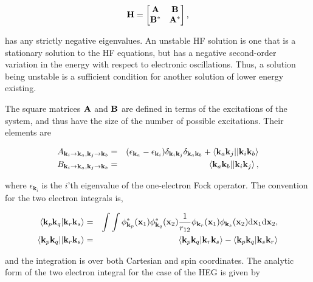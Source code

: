 \documentclass{revtex4}
\newcommand{\ki}{\mathbf{k}_{i}}
\newcommand{\kj}{\mathbf{k}_{j}}
\newcommand{\ka}{\mathbf{k}_{a}}
\newcommand{\kb}{\mathbf{k}_{b}}
\newcommand{\kp}{\mathbf{k}_{p}}
\newcommand{\kq}{\mathbf{k}_{q}}
\newcommand{\kr}{\mathbf{k}_{r}}
\newcommand{\ks}{\mathbf{k}_{s}}
\begin{document}
\begin{eqnarray} \label{H}
  \bf{H} = 
  \begin{bmatrix}
    \bf{A}   & \bf{B} \\
    \bf{B^*} & \bf{A^*}\\
  \end{bmatrix},
\end{eqnarray}

has any strictly negative eigenvalues. An unstable HF solution is one that is a stationary solution
to the HF equations, but has a negative second-order variation in the energy with respect to 
electronic oscillations. Thus, a solution being
unstable is a sufficient condition for another solution of lower energy existing. 

The square matrices $\bf{A}$ and $\bf{B}$ are defined in 
terms of the excitations of the system, and thus have the size of the number of possible 
excitations. Their elements are

\begin{eqnarray} \label{A_B}
	A_{\ki\rightarrow \ka, \kj\rightarrow \kb} &=& 
	(\epsilon_{\ka} - \epsilon_{\ki})\delta_{\ki\kj}\delta_{\ka\kb} + \braket{\ka\kj||\ki\kb}\\
	B_{\ki\rightarrow \ka, \kj\rightarrow \kb} &=& \braket{\ka\kb||\ki\kj},  \nonumber
\end{eqnarray}

where $\epsilon_{\ki}$ is the $i$'th eigenvalue of the one-electron Fock operator. 
The convention for the two electron integrals is, 

\begin{eqnarray} \label{TwoElectron}
  \braket{\kp\kq|\kr\ks}  &=& \int\int \phi_{\kp}^*(\mathbf{x}_1) \phi_{\kq}^*(\mathbf{x}_2) 
                              \frac{1}{r_{12}} 
                              \phi_{\kr}(\mathbf{x}_1) \phi_{\ks}(\mathbf{x}_2) 
                              \mathrm{d}\mathbf{x}_1  \mathrm{d}\mathbf{x}_2, \\
  \braket{\kp\kq||\kr\ks} &=& \braket{\kp\kq|\kr\ks} - \braket{\kp\kq|\ks\kr}                  
\end{eqnarray}

and the integration is over both Cartesian and spin coordinates. The analytic form of the two 
electron integral for the case of the HEG is given by
\end{document}
